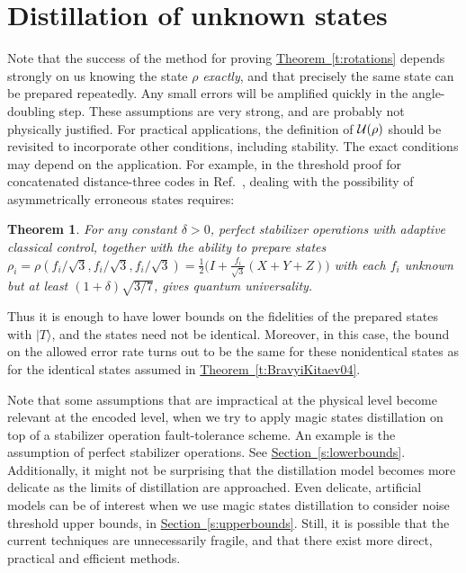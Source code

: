 \documentclass[11pt]{article}
\def\ket #1{\vert #1\rangle}
\newtheorem{theorem}{Theorem}  %
\theoremstyle{note}
\newcommand{\thmref}[1]{\hyperref[#1]{{Theorem~\ref*{#1}}}}
\newcommand{\secref}[1]{\hyperref[#1]{{Section~\ref*{#1}}}}
\begin{document}
\section{Distillation of unknown states}

Note that the success of the method for proving \thmref{t:rotations} depends strongly on us knowing the state $\rho$ \emph{exactly}, and that precisely the same state can be prepared repeatedly.  Any small errors will be amplified quickly in the angle-doubling step.  These assumptions are very strong, and are probably not physically justified.  For practical applications, the definition of $\mathcal{U}(\rho)$ should be revisited to incorporate other conditions, including stability.  The exact conditions may depend on the application.  For example, in the threshold proof for concatenated distance-three codes in Ref.~\cite{Reichardt05distancethree}, dealing with the possibility of asymmetrically erroneous states requires: 

\begin{theorem} \label{t:practicalmagicrandom}
For any constant $\delta > 0$, perfect stabilizer operations with adaptive classical control, together with the ability to prepare states $\rho_i = \rho(f_i/\sqrt 3, f_i/\sqrt 3, f_i/\sqrt 3) = \tfrac{1}{2}\big(I + \tfrac{f_i}{\sqrt{3}}(X+Y+Z)\big)$ with each $f_i$ unknown but at least $(1+\delta) \sqrt{3/7}$, gives quantum universality.  
\end{theorem}

Thus it is enough to have lower bounds on the fidelities of the prepared states with $\ket T$, and the states need not be identical.  Moreover, in this case, the bound on the allowed error rate turns out to be the same for these nonidentical states as for the identical states assumed in \thmref{t:BravyiKitaev04}.  

Note that some assumptions that are impractical at the physical level become relevant at the encoded level, when we try to apply magic states distillation on top of a stabilizer operation fault-tolerance scheme.  An example is the assumption of perfect stabilizer operations.  See \secref{s:lowerbounds}.  Additionally, it might not be surprising that the distillation model becomes more delicate as the limits of distillation are approached.  Even delicate, artificial models can be of interest when we use magic states distillation to consider noise threshold upper bounds, in \secref{s:upperbounds}.  Still, it is possible that the current techniques are unnecessarily fragile, and that there exist more direct, practical and efficient methods.
\end{document}
